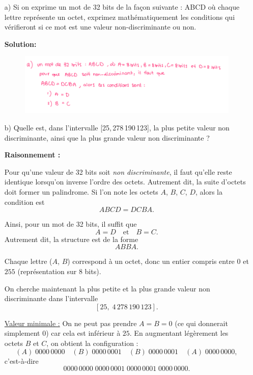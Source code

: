 \documentclass{article}
\begin{document}
\begin{enumerate}
    \item[a)] Si on exprime un mot de 32 bits de la façon suivante : ABCD
    où chaque lettre représente un octet, exprimez mathématiquement les conditions 
    qui vérifieront si ce mot est une valeur non-discriminante ou non.

    \textbf{Solution:}
    \begin{figure}[h!]
      \centering
      \includegraphics[width=1\textwidth]{images/palyndrome_q4_a.png}
    \end{figure}

    \item[b)] Quelle est, dans l’intervalle [25,\,278\,190\,123],
    la plus petite valeur non discriminante, ainsi que la plus grande valeur non discriminante ?

    \textbf{Raisonnement :}

Pour qu’une valeur de 32 bits soit \emph{non discriminante}, il faut qu’elle reste identique lorsqu’on inverse l’ordre des octets. 
Autrement dit, la suite d’octets doit former un palindrome. 
Si l’on note les octets $A$, $B$, $C$, $D$, alors la condition est
\[
ABCD = DCBA.
\]

Ainsi, pour un mot de 32 bits, il suffit que
\[
A = D \quad \text{et} \quad B = C.
\]
Autrement dit, la structure est de la forme
\[
ABBA.
\]

Chaque lettre ($A$, $B$) correspond à un octet, donc un entier compris entre $0$ et $255$ (représentation sur 8 bits).

\medskip

On cherche maintenant la plus petite et la plus grande valeur non discriminante dans l’intervalle
\[
[25,\; 4\,278\,190\,123].
\]

\medskip

\underline{Valeur minimale :}  
On ne peut pas prendre $A = B = 0$ (ce qui donnerait simplement $0$) car cela est inférieur à $25$.  
En augmentant légèrement les octets $B$ et $C$, on obtient la configuration :
\[
(A)\;0000\,0000 \quad (B)\;0000\,0001 \quad (B)\;0000\,0001 \quad (A)\;0000\,0000,
\]
c’est-à-dire
\[
0000\,0000\;0000\,0001\;0000\,0001\;0000\,0000.
\]


\end{enumerate}
\end{document}
